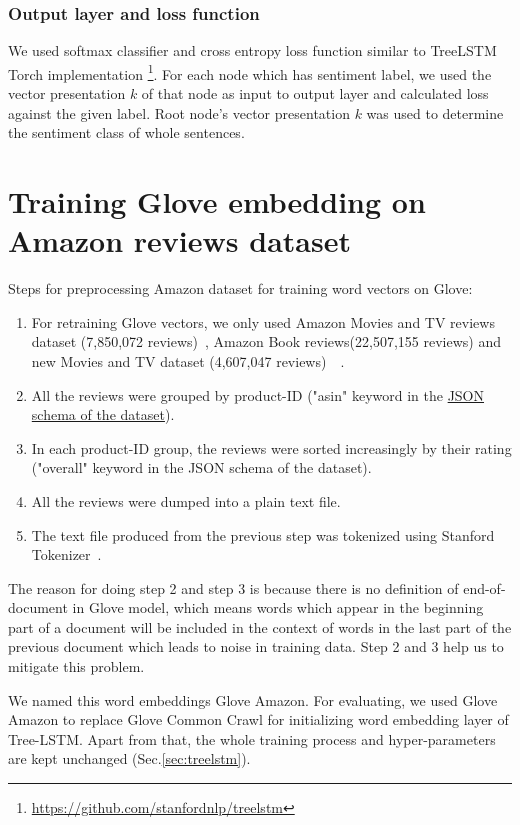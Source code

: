 \subsubsection{Output layer and loss function}
We used softmax classifier and cross entropy loss function similar to TreeLSTM \cite{treelstm} Torch implementation \footnote{\url{https://github.com/stanfordnlp/treelstm}}. 
For each node which has sentiment label, we used the vector presentation $k$ of that node as input to output layer and calculated loss against the given label.
Root node's vector presentation $k$ was used to determine the sentiment class of whole sentences.

\hypertarget{sec:Glove-Amazon}{\section{Training Glove embedding on Amazon reviews dataset}}
\label{sec:gloveamazone}
Steps for preprocessing Amazon dataset for training word vectors on Glove:
\begin{enumerate}
\item For retraining Glove vectors, we only used Amazon Movies and TV reviews dataset (7,850,072 reviews)~\cite{mcauley2013hidden}, Amazon Book reviews(22,507,155 reviews) and new Movies and TV dataset (4,607,047 reviews)~\cite{McAuleyTSH15}~\cite{HeM16}.
\item All the reviews were grouped by product-ID ("asin" keyword in the \hyperref[sec:amazon]{JSON schema of the dataset}).
\item In each product-ID group, the reviews were sorted increasingly by their rating ("overall" keyword in the JSON schema of the dataset).
\item All the reviews were dumped into a plain text file.
\item The text file produced from the previous step was tokenized using Stanford Tokenizer~\cite{tokenizerpart}.
\end{enumerate}

The reason for doing step 2 and step 3 is because there is no definition of end-of-document in Glove model, which means words which appear in the beginning part of a document will be included in the context of words in the last part of the previous document which leads to noise in training data. Step 2 and 3 help us to mitigate this problem.

We named this word embeddings Glove Amazon.
For evaluating, we used Glove Amazon to replace Glove Common Crawl for initializing word embedding layer of Tree-LSTM.
Apart from that, the whole training process and hyper-parameters are kept unchanged (Sec.\ref{sec:treelstm}).

